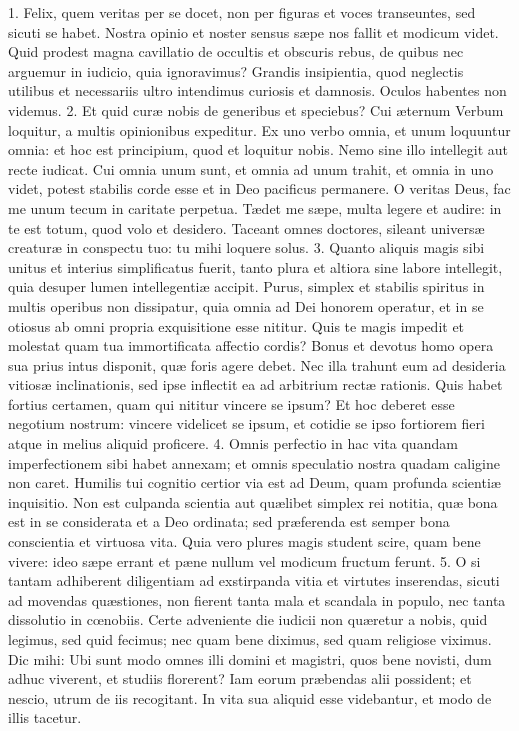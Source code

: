 \documentclass[twoside]{article}
\begin{document}
1. Felix, quem veritas per se docet, non per figuras et voces transeuntes, sed sicuti se habet. Nostra opinio et noster sensus sæpe nos fallit et modicum videt. Quid prodest magna cavillatio de occultis et obscuris rebus, de quibus nec arguemur in iudicio, quia ignoravimus? Grandis insipientia, quod neglectis utilibus et necessariis ultro intendimus curiosis et damnosis. Oculos habentes non videmus.
2. Et quid curæ nobis de generibus et speciebus? Cui æternum Verbum loquitur, a multis opinionibus expeditur. Ex uno verbo omnia, et unum loquuntur omnia: et hoc est principium, quod et loquitur nobis. Nemo sine illo intellegit aut recte iudicat. Cui omnia unum sunt, et omnia ad unum trahit, et omnia in uno videt, potest stabilis corde esse et in Deo pacificus permanere. O veritas Deus, fac me unum tecum in caritate perpetua. Tædet me sæpe, multa legere et audire: in te est totum, quod volo et desidero. Taceant omnes doctores, sileant universæ creaturæ in conspectu tuo: tu mihi loquere solus.
3. Quanto aliquis magis sibi unitus et interius simplificatus fuerit, tanto plura et altiora sine labore intellegit, quia desuper lumen intellegentiæ accipit. Purus, simplex et stabilis spiritus in multis operibus non dissipatur, quia omnia ad Dei honorem operatur, et in se otiosus ab omni propria exquisitione esse nititur. Quis te magis impedit et molestat quam tua immortificata affectio cordis? Bonus et devotus homo opera sua prius intus disponit, quæ foris agere debet. Nec illa trahunt eum ad desideria vitiosæ inclinationis, sed ipse inflectit ea ad arbitrium rectæ rationis. Quis habet fortius certamen, quam qui nititur vincere se ipsum? Et hoc deberet esse negotium nostrum: vincere videlicet se ipsum, et cotidie se ipso fortiorem fieri atque in melius aliquid proficere.
4. Omnis perfectio in hac vita quandam imperfectionem sibi habet annexam; et omnis speculatio nostra quadam caligine non caret. Humilis tui cognitio certior via est ad Deum, quam profunda scientiæ inquisitio. Non est culpanda scientia aut quælibet simplex rei notitia, quæ bona est in se considerata et a Deo ordinata; sed præferenda est semper bona conscientia et virtuosa vita. Quia vero plures magis student scire, quam bene vivere: ideo sæpe errant et pæne nullum vel modicum fructum ferunt.
5. O si tantam adhiberent diligentiam ad exstirpanda vitia et virtutes inserendas, sicuti ad movendas quæstiones, non fierent tanta mala et scandala in populo, nec tanta dissolutio in cœnobiis. Certe adveniente die iudicii non quæretur a nobis, quid legimus, sed quid fecimus; nec quam bene diximus, sed quam religiose viximus. Dic mihi: Ubi sunt modo omnes illi domini et magistri, quos bene novisti, dum adhuc viverent, et studiis florerent? Iam eorum præbendas alii possident; et nescio, utrum de iis recogitant. In vita sua aliquid esse videbantur, et modo de illis tacetur.
\end{document}
